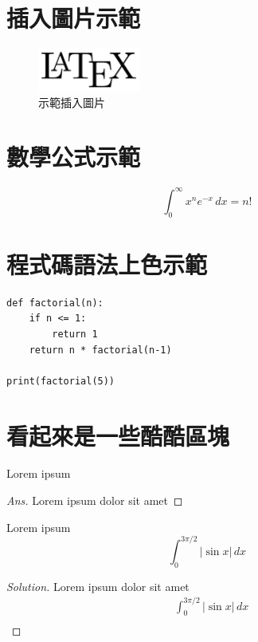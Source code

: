 \documentclass[12pt]{article}
\newenvironment{exercise}[2][Exercise]{\begin{trivlist}
\item[\hskip \labelsep {\bfseries #1}\hskip \labelsep {\bfseries #2.}]}{\end{trivlist}}
\newenvironment{problem}[2][Problem]{\begin{trivlist}
\item[\hskip \labelsep {\bfseries #1}\hskip \labelsep {\bfseries #2}]}{\end{trivlist}}
\newenvironment{solution}{\begin{proof}[Solution]}{\end{proof}}
\newenvironment{answer}{\begin{proof}[Ans]}{\end{proof}}
\begin{document}
\section{插入圖片示範}
\begin{figure}[ht]
  \centering
  \includegraphics[width=0.3\textwidth]{example.png} %
  \caption{示範插入圖片}
  \label{fig:example}
\end{figure}

\section{數學公式示範}
\[
  \int_{0}^{\infty} x^n e^{-x}\, dx = n!
\]

\section{程式碼語法上色示範}
\begin{verbatim}
def factorial(n):
    if n <= 1:
        return 1
    return n * factorial(n-1)

print(factorial(5))
\end{verbatim}

\section{看起來是一些酷酷區塊}

\begin{problem}{1}
  Lorem ipsum
\end{problem}

\begin{answer}
  Lorem ipsum dolor sit amet
\end{answer}

\begin{exercise}{123}
  Lorem ipsum
  \begin{equation*}
    \int_0^{3\pi/2}|\sin x|\,dx
  \end{equation*}
\end{exercise}

\begin{solution}
  Lorem ipsum dolor sit amet
  \begin{equation*}
    \begin{split}
      &  \int_0^{3\pi/2}|\sin x|\,dx \\
    \end{split}
  \end{equation*}
\end{solution}

\end{document}
